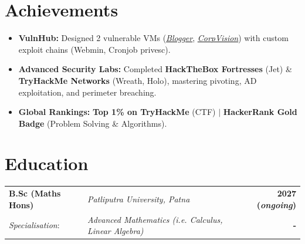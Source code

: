 \documentclass[10pt]{article}
\begin{document}
\section{Achievements}

\begin{itemize}[leftmargin=2em]
	\item \textbf{VulnHub:} Designed 2 vulnerable VMs (\href{https://www.vulnhub.com/entry/blogger-1,675/}{\textit{Blogger}}, \href{https://www.vulnhub.com/entry/corpvision-1,691/}{\textit{CorpVision}}) with custom exploit chains (Webmin, Cronjob privesc).
	\item \textbf{Advanced Security Labs:} Completed \textbf{HackTheBox Fortresses} (Jet) \& \textbf{TryHackMe Networks} (Wreath, Holo), mastering pivoting, AD exploitation, and perimeter breaching.
	\item \textbf{Global Rankings:} \textbf{Top 1\% on TryHackMe} (CTF) $|$ \textbf{HackerRank Gold Badge} (Problem Solving \& Algorithms).
\end{itemize}


\section{Education}

\begin{tabular}{@{} p{} p{} r @{}}
	\textbf{B.Sc (Maths Hons)} & \textit{Patliputra University, Patna}                        & \textbf{2027 (\textit{ongoing})} \\
	\textit{Specialisation}:   & \textit{Advanced Mathematics (i.e. Calculus, Linear Algebra)} & \textbf{-}                       \\
\end{tabular}

\end{document}
